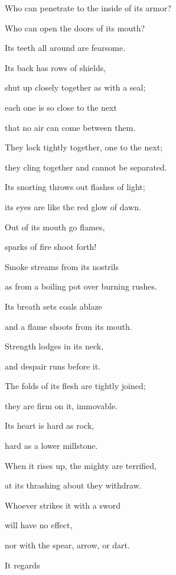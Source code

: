 {\par }{\Q Who
can penetrate
to the inside
of its armor?
\par }{\Q {}Who
can open
the doors
of its mouth?

\par }{\Q Its teeth
all around
are fearsome.
\par }{\Q {}Its back
has rows
of shields,
\par }{\Q shut up
closely together as with a seal;
\par }{\Q {}each
one
is so close
to the next

\par }{\Q that no
air
can come
between them.
\par }{\Q {}They lock tightly
together, one to the next;
\par }{\Q they cling
together and cannot
be separated.
\par }{\Q {}Its snorting
throws out flashes
of light;
\par }{\Q its eyes
are
like the red glow
of dawn.
\par }{\Q {}Out of its mouth
go
flames,
\par }{\Q sparks
of fire shoot forth!
\par }{\Q {}Smoke
streams from its nostrils
\par }{\Q as from a boiling
pot
over burning rushes.
\par }{\Q {}Its breath
sets
coals
ablaze
\par }{\Q and a flame
shoots
from its mouth.
\par }{\Q {}Strength
lodges
in its neck,
\par }{\Q and despair
runs before it.
\par }{\Q {}The folds
of its flesh
are tightly
joined;
\par }{\Q they are firm on
it, immovable.
\par }{\Q {}Its
heart
is hard as rock,
\par }{\Q hard as a lower
millstone.
\par }{\Q {}When it rises up,
the mighty
are terrified,
\par }{\Q at its thrashing
about they withdraw.
\par }{\Q {}Whoever strikes
it with a sword
\par }{\Q will have no
effect,
\par }{\Q nor with the spear,
arrow, or dart.
\par }{\Q {}It regards
}
